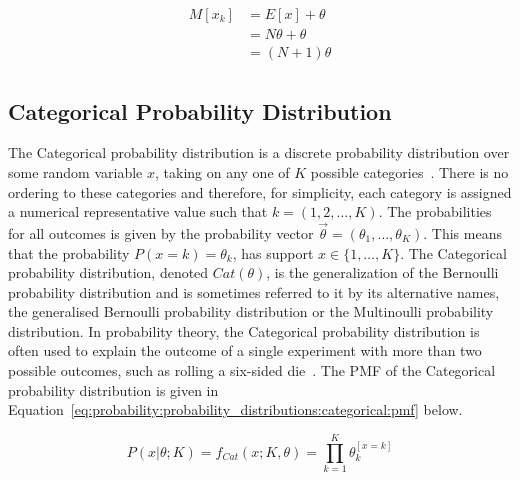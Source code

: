 \begin{align}
      \label{eq:probability:probability_distributions:binomial:mode}
      \begin{split}
            M[x_{k}] &= E[x] + \theta \\
            &= N\theta  + \theta \\
            &= (N  + 1)\theta
      \end{split}
\end{align}

\subsection{Categorical Probability Distribution}\label{sec:probability:probability_distributions:categorical}

The Categorical probability distribution is a discrete probability distribution over some random variable $x$, taking on any one of $K$ possible categories~\cite{ref:wackerly:2014}. There is no ordering to these categories and therefore, for simplicity, each category is assigned a numerical representative value such that $k = (1, 2, \dots, K)$. The probabilities for all outcomes is given by the probability vector $\vec{\theta} = (\theta_{1}, \dots, \theta_{K})$.  This means that the probability $P(x=k)=\theta_{k}$, has support $x \in \{1, \dots, K\}$. The Categorical probability distribution, denoted $Cat(\theta)$, is the generalization of the Bernoulli probability distribution and is sometimes referred to it by its alternative names, the generalised Bernoulli probability distribution or the Multinoulli probability distribution. In probability theory, the Categorical probability distribution is often used to explain the outcome of a single experiment with more than two possible outcomes, such as rolling a six-sided die~\cite{ref:wackerly:2014}. The \acs{PMF} of the Categorical probability distribution is given in Equation~\eqref{eq:probability:probability_distributions:categorical:pmf} below.

\begin{equation}
      \label{eq:probability:probability_distributions:categorical:pmf}
      P(x \vert \theta; K) = f_{Cat}(x; K, \theta) = \prod_{k=1}^{K}\theta_{k}^{[x = k]}
\end{equation}

